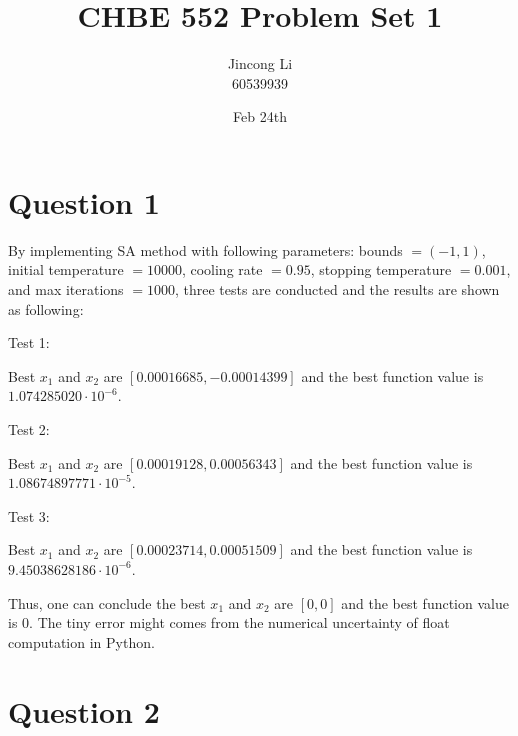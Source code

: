 \documentclass[a4paper,12pt]{article} %
\begin{document}
\setlength{\parskip}{1em} 
\setlength{\parindent}{0pt}
\newcommand{\vect}[1]{\mathbf{#1}}

\title{CHBE 552 Problem Set 1}
\author{Jincong Li \\ 60539939}
\date{Feb 24th}
\maketitle

\section*{\textbf{Question 1}}
By implementing SA method with following parameters: bounds $= (-1, 1)$, initial temperature $= 10000$, cooling rate $= 0.95$, stopping temperature $= 0.001$, and max iterations $= 1000$,
three tests are conducted and the results are shown as following:

Test 1:

Best $x_1$ and $x_2$ are $[ 0.00016685, -0.00014399]$ and the
best function value is $1.074285020 \cdot 10^{-6}$.

Test 2:

Best $x_1$ and $x_2$ are $[0.00019128, 0.00056343]$ and the
best function value is $1.08674897771 \cdot 10^{-5}$.

Test 3:

Best $x_1$ and $x_2$ are $[0.00023714, 0.00051509]$ and the
best function value is $9.45038628186 \cdot 10^{-6}$.

Thus, one can conclude the best $x_1$ and $x_2$ are $[0, 0]$ and the
best function value is $0$. The tiny error might comes from the numerical uncertainty of float computation in Python.

\section*{\textbf{Question 2}}
\end{document}
